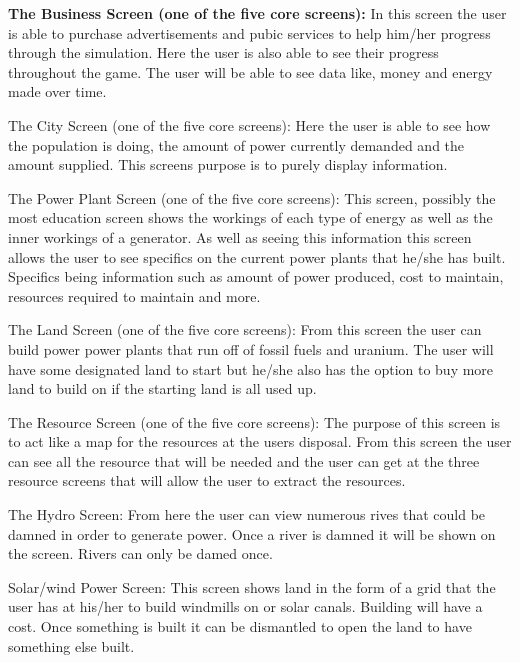 \documentclass[msc,oneside]{ubcthesis}%
\begin{document}
\noindent \large \textbf{ The Business Screen (one of the five core screens):} \newline
\indent In this screen the user is able to purchase advertisements and pubic services to help him/her 
progress through the simulation. Here the user is also able to see their progress throughout the game. The 
user will be able to see data like, money and energy made over time.  
\bigskip

\noindent The City Screen (one of the five core screens): \newline
\indent Here the user is able to see how the population is doing, the amount of power currently demanded and the amount supplied. This screens purpose is to purely display information.
\bigskip

\noindent The Power Plant Screen (one of the five core screens): \newline
\indent This screen, possibly the most education screen shows the workings of each type of energy as well as the inner workings of a generator. As well as seeing this information this screen allows the user to 
see specifics on the current power plants that he/she has built. Specifics being information such as 
amount of power produced, cost to maintain, resources required to maintain and more. 
\bigskip

\noindent The Land Screen (one of the five core screens): \newline
\indent From this screen the user can build power power plants that run off of fossil fuels and uranium. The user will have some designated land to start but he/she also has the option to buy more land to build 
on if the starting land is all used up.
\bigskip

\noindent The Resource Screen (one of the five core screens): \newline
\indent The purpose of this screen is to act like a map for the resources at the users disposal. From this 
screen the user can see all the resource that will be needed and the user can get at the three resource 
screens that will allow the user to extract the resources.
\bigskip

\noindent The Hydro Screen: \newline
\indent From here the user can view numerous rives that could be damned in order to generate power. Once a 
river is damned it will be shown on the screen. Rivers can only be damed once. 
\bigskip

\noindent Solar/wind Power Screen: \newline
\indent This screen shows land in the form of a grid that the user has at his/her to build windmills on or 
solar canals. Building will have a cost. Once something is built it can be dismantled to open the land 
to have something else built. 
\bigskip
\end{document}
